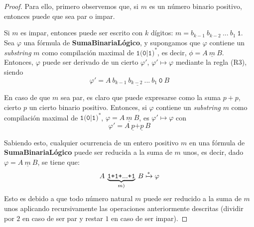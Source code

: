\begin{proof}
Para ello, primero observemos que, si $m$ es un número binario positivo, entonces puede que sea par o impar.

Si $m$ es impar, entonces puede ser escrito con $k$ dígitos: $m=b_{k-1}\:b_{k-2}\:...\:b_1\:\texttt{1}$. Sea $\varphi$ una fórmula de \textbf{SumaBinariaLógico}, y supongamos que $\varphi$ contiene un \emph{substring} $m$ como compilación maximal de $\texttt{1(0|1)}^\texttt{*}$, es decir, $\phi=A\:\underline{m}\:B$. Entonces, $\varphi$ puede ser derivado de un cierto $\varphi'$, $\varphi'\mapsto\varphi$ mediante la regla (R3), siendo$$\varphi'=A\:\underline{b_{k-1}\:b_{k-2}\:...\:b_1\:\texttt{0}}\:B$$

En caso de que $m$ sea par, es claro que puede expresarse como la suma $p+p$, cierto $p$ un cierto binario positivo. Entonces, si $\varphi$ contiene un \emph{substring} $m$ como compilación maximal de $\texttt{1(0|1)}^\texttt{*}$, $\varphi=A\:\underline{m}\:B$, es $\varphi'\mapsto\varphi$ con $$\varphi'=A\:\underline{p}\texttt{+}\underline{p}\:B$$

Sabiendo esto, cualquier ocurrencia de un entero positivo $m$ en una fórmula de \textbf{SumaBinariaLógico} puede ser reducida a la suma de $m$ unos, es decir, dado $\varphi=A\:\underline{m}\:B$, se tiene que:
$$A\:\underbrace{\texttt{1}\texttt{+}\texttt{1}\texttt{+}...\texttt{+}\texttt{1}}_{m)}\:B\xmapsto{*}\varphi$$
Esto es debido a que todo número natural $m$ puede ser reducido a la suma de $m$ unos aplicando recursivamente las operaciones anteriormente descritas (dividir por $2$ en caso de ser par y restar $1$ en caso de ser impar).
\end{proof}

